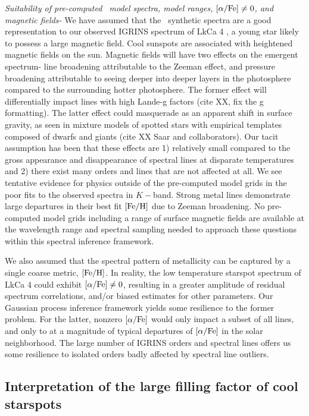 \documentclass[twocolumn]{emulateapj}%
\newcommand{\name}{LkCa 4 }
\begin{document}
\emph{Suitability of pre-computed \PHOENIX\ model spectra, model ranges, $[\alpha/{\rm Fe}] \neq 0$, and magnetic fields-} We have assumed that the \PHOENIX\ synthetic spectra are a good representation to our observed IGRINS spectrum of \name, a young star likely to possess a large magnetic field.  Cool sunspots are associated with heightened magnetic fields on the sun.  Magnetic fields will have two effects on the emergent spectrum- line broadening attributable to the Zeeman effect, and pressure broadening attributable to seeing deeper into deeper layers in the photosphere compared to the surrounding hotter photosphere.  The former effect will differentially impact lines with high Lande-g factors (cite XX, fix the g formatting).  The latter effect could masquerade as an apparent shift in surface gravity, as seen in mixture models of spotted stars with empirical templates composed of dwarfs and giants (cite XX Saar and collaborators).  Our tacit assumption has been that these effects are 1) relatively small compared to the gross appearance and disappearance of spectral lines at disparate temperatures and 2) there exist many orders and lines that are not affected at all.  We see tentative evidence for physics outside of the pre-computed model grids in the poor fits to the observed spectra in $K-$band.  Strong metal lines demonstrate large departures in their best fit $[{\rm Fe}/{\rm H}]$ due to Zeeman broadening.  No pre-computed model grids including a range of surface magnetic fields are available at the wavelength range and spectral sampling needed to approach these questions within this spectral inference framework.

We also assumed that the spectral pattern of metallicity can be captured by a single coarse metric, $[{\rm Fe}/{\rm H}]$.  In reality, the low temperature starspot spectrum of \name could exhibit $[\alpha/{\rm Fe}] \neq 0$, resulting in a greater amplitude of residual spectrum correlations, and/or biased estimates for other parameters.  Our Gaussian process inference framework yields some resilience to the former problem.  For the latter, nonzero $[\alpha/{\rm Fe}]$ would only impact a subset of all lines, and only to at a magnitude of typical departures of $[\alpha/{\rm Fe}]$ in the solar neighborhood.  The large number of IGRINS orders and spectral lines offers us some resilience to isolated orders badly affected by spectral line outliers.


\subsection{Interpretation of the large filling factor of cool starspots}
\end{document}

